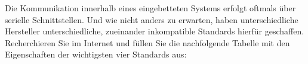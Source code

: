 \teilaufgabe
Die Kommunikation innerhalb eines eingebetteten Systems erfolgt oftmals über
serielle Schnittstellen. Und wie nicht anders zu erwarten, haben unterschiedliche
Hersteller unterschiedliche, zueinander inkompatible Standards hierfür geschaffen.
Recherchieren Sie im Internet und füllen Sie die nachfolgende Tabelle mit den
Eigenschaften der wichtigsten vier Standards aus:

\newcommand{\SerialVergleich}[1]{
    {
        \renewcommand{\arraystretch}{1.8}
        \newcolumntype{Y}{>{\centering\arraybackslash}X}
        \newcolumntype{R}{>{\raggedleft\arraybackslash}p}
        \newcolumntype{L}{>{\raggedright\arraybackslash}X}
        \vskip \LTpre

        \begin{tabularx}{\textwidth}{|R{.33\textwidth}|L|L|L|L|}
            \hline
            &
            \textbf{UART}    &
            \textbf{SPI}     &
            \textbf{I²C}     &
            \textbf{1-wire}
            \\

            \hline
            \textbf{Synchron / Asynchron} &
            \loesungswert{#1}{Asynchron} &                      %
            \loesungswert{#1}{Synchron} &                       %
            \loesungswert{#1}{Synchron} &                       %
            \loesungswert{#1}{Asynchron}                        %
            \\[2em]

            \hline
            \textbf{Full-Duplex / Half-Duplex} &
            \loesungswert{#1}{Full-Duplex} &                    %
            \loesungswert{#1}{Full-Duplex} &                    %
            \loesungswert{#1}{Half-Duplex} &                    %
            \loesungswert{#1}{Half-Duplex}                      %
            \\[2em]

            \hline
            \textbf{Mehrere Empfänger möglich} &
            \loesungswert{#1}{Nein} &                           %
            \loesungswert{#1}{Ja} &                             %
            \loesungswert{#1}{Ja} &                             %
            \loesungswert{#1}{Ja}                               %
            \\[2em]


\end{tabularx}}}
